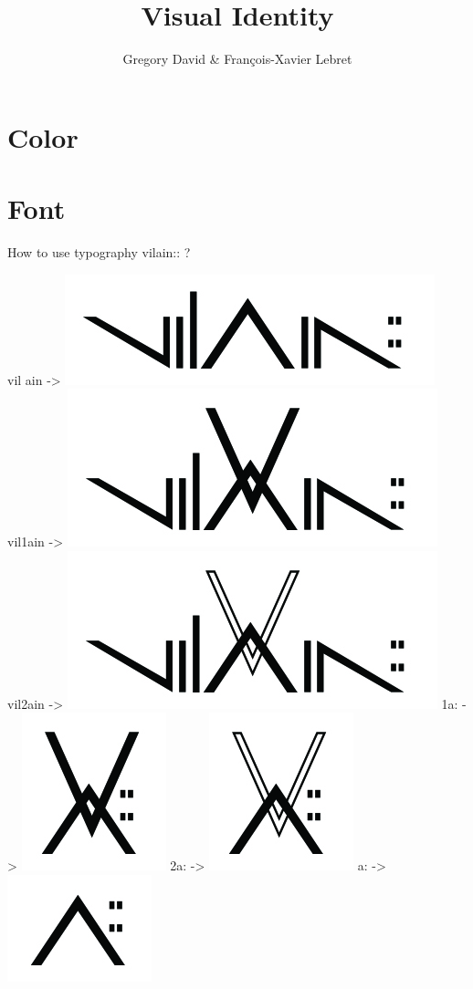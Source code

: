 \documentclass{report}
\title{Visual Identity}
\author{Gregory David & François-Xavier Lebret}
\begin{document}
\part{Color}

\part{Font}
How to use typography vilain:: ?

vil ain -> \includegraphics[scale=0.2]{logov1.jpg}
\newline
vil1ain -> \includegraphics[scale=0.2]{logov2.jpg}
\newline
vil2ain -> \includegraphics[scale=0.2]{logov3.jpg}
\newline
1a: -> \includegraphics[scale=0.2]{logov4.jpg}
\newline
2a: -> \includegraphics[scale=0.2]{logov5.jpg}
\newline
 a: -> \includegraphics[scale=0.2]{logov6.jpg}
\end{document}

